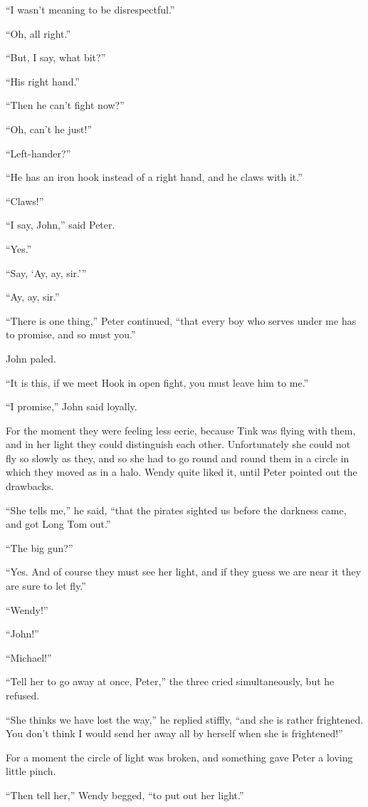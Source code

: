 “I wasn’t meaning to be disrespectful.”

“Oh, all right.”

“But, I say, what bit?”

“His right hand.”

“Then he can’t fight now?”

“Oh, can’t he just!”

“Left-hander?”

“He has an iron hook instead of a right hand,
and he claws with it.”

“Claws!”

“I say, John,” said Peter.

“Yes.”

“Say, ‘Ay, ay, sir.’”

“Ay, ay, sir.”

“There is one thing,” Peter continued,
“that every boy who serves under me has to promise,
and so must you.”

John paled.

“It is this, if we meet Hook in open fight,
you must leave him to me.”

“I promise,” John said loyally.

For the moment they were feeling less eerie,
because Tink was flying with them, and in her light they could distinguish each other.
Unfortunately she could not fly so slowly as they,
and so she had to go round and round them in a circle in which they moved as in a halo.
Wendy quite liked it, until Peter pointed out the drawbacks.

“She tells me,” he said, “that the pirates sighted us before the darkness came,
and got Long Tom out.”

“The big gun?”

“Yes.
And of course they must see her light,
and if they guess we are near it they are sure to let fly.”

“Wendy!”

“John!”

“Michael!”

“Tell her to go away at once, Peter,” the three cried simultaneously, but he refused.

“She thinks we have lost the way,” he replied stiffly, “and she is rather frightened.
You don’t think I would send her away all by herself when she is frightened!”

For a moment the circle of light was broken, and something gave Peter a loving little pinch.

“Then tell her,” Wendy begged, “to put out her light.”

